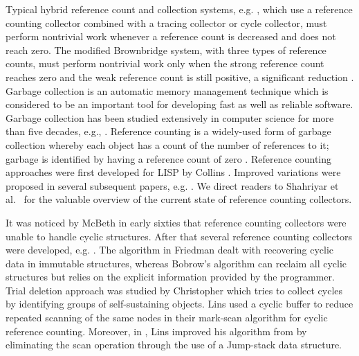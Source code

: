Typical hybrid reference count and collection systems, e.g. \cite{Bacon2001,Levanoni2006,Bacon:2001:JWC,Barabash2005,Lins2008}, which use a reference counting collector combined with a tracing collector or cycle collector,
must perform nontrivial work whenever a reference count is decreased and does
not reach zero. The modified Brownbridge system, with three types of reference counts, must
perform nontrivial work only when the strong reference count reaches zero and
the weak reference count is still positive, a significant reduction \cite{Brownbridge1985,Jones1996}.
Garbage collection is
an automatic memory management technique which is considered to be an important tool for developing fast as well as reliable software.  Garbage collection has been studied extensively in computer science for more than five decades, e.g., \cite{McBeth1963,Brownbridge1985,Salkild1987,Pepels1988,Bacon2001,Bacon:2001:JWC,Barabash2005,Jones1996}. %
Reference counting is a widely-used form of garbage collection whereby each object has a count of the number of references to it; garbage is identified by having a reference count of zero \cite{Bacon2001}.
Reference counting approaches were first developed for LISP by Collins \cite{Collins1960}.
Improved variations were proposed in several subsequent papers, e.g. \cite{Friedman1979,Hughes1987,Jones1996,Lins2008,Levanoni2006}. We direct readers to Shahriyar et al.~\cite{Shahriyar:2012} for the valuable overview of the current state of reference counting collectors.

It was noticed by McBeth \cite{McBeth1963} in early sixties that reference counting collectors were unable to handle cyclic structures.
After that several reference counting collectors were developed, e.g. \cite{Friedman1979,Bobrow1980,Lins:1992:CRC,Lins:2002:EAC}.
The algorithm in Friedman \cite{Friedman1979} dealt with recovering cyclic data in immutable structures, whereas Bobrow's algorithm \cite{Bobrow1980}
can reclaim all cyclic structures but relies on the explicit
information provided by the programmer. 
Trial deletion approach was studied by Christopher \cite{Christopher1984} which tries to collect cycles by identifying groups of self-sustaining objects. 
Lins \cite{Lins:1992:CRC} used a cyclic buffer to reduce repeated scanning of the same nodes in their mark-scan algorithm for cyclic reference counting. Moreover, in \cite{Lins:2002:EAC}, Lins improved his algorithm  from \cite{Lins:1992:CRC} by eliminating the scan operation through the use of a Jump-stack data structure.


